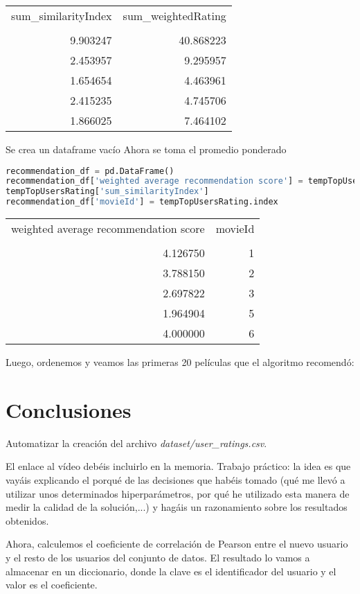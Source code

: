 \documentclass{uimppracticas}
\begin{document}
\begin{tabular}{rr}
	\toprule
	sum\_similarityIndex &  sum\_weightedRating \\
	&                     \\
	\midrule
	9.903247 &           40.868223 \\
	2.453957 &            9.295957 \\
	1.654654 &            4.463961 \\
	2.415235 &            4.745706 \\
	1.866025 &            7.464102 \\
	\bottomrule
\end{tabular}

Se crea un dataframe vacío
Ahora se toma el promedio ponderado

\begin{lstlisting}[language=python]
recommendation_df = pd.DataFrame()
recommendation_df['weighted average recommendation score'] = tempTopUsersRating['sum_weightedRating'] / \
tempTopUsersRating['sum_similarityIndex']
recommendation_df['movieId'] = tempTopUsersRating.index
\end{lstlisting}

\begin{tabular}{rr}
	\toprule
	weighted average recommendation score &  movieId \\
	&          \\
	\midrule
	4.126750 &        1 \\
	3.788150 &        2 \\
	2.697822 &        3 \\
	1.964904 &        5 \\
	4.000000 &        6 \\
	\bottomrule
\end{tabular}


Luego, ordenemos y veamos las primeras 20 películas que el algoritmo recomendó:




\newpage

\section{Conclusiones}

Automatizar la creación del archivo \textit{dataset/user\_ratings.csv}.

El enlace al vídeo debéis incluirlo en la memoria. Trabajo práctico: la idea es que vayáis explicando el porqué de las decisiones que habéis tomado (qué me llevó a utilizar unos determinados hiperparámetros, por qué he utilizado esta manera de medir la calidad de la solución,...) y hagáis un razonamiento sobre los resultados obtenidos.

Ahora, calculemos el coeficiente de correlación de Pearson entre el nuevo usuario y el resto de los usuarios del conjunto de datos. El resultado lo vamos a almacenar en un diccionario, donde la clave es el identificador del usuario y el valor es el coeficiente.


\newpage

\renewcommand{\refname}{Bibliografía}


	
\end{document}
